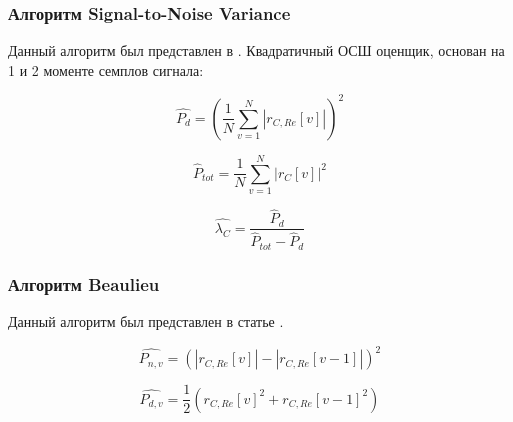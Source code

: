 \subsubsection{Алгоритм Signal-to-Noise Variance}
\label{sssec:snv}

Данный алгоритм был представлен в \cite{snr_pauluzzi, snr_li}. Квадратичный ОСШ оценщик, основан на 1
и 2 моменте семплов сигнала:

\begin{center}
\begin{equation}
	\hat{P_{d}} = (\frac{1}{N} \sum \limits_{v=1}^N \left| r_{C,Re}[v] \right|)^2
\end{equation}
\end{center}

\begin{center}
\begin{equation}
	\hat P_{tot} = \frac{1}{N} \sum \limits_{v=1}^{N} \left|r_C[v] \right| ^2
\end{equation}
\end{center}

\begin{center}
\begin{equation}
	\hat{\lambda_C} = \frac{\hat P_d}{\hat P_{tot} - \hat P_d}
\end{equation}
\end{center}

\subsubsection{Алгоритм Beaulieu}
\label{sssec:beaulieu}

Данный алгоритм был представлен в статье \cite{snr_beaulieu}.

\begin{center}
\begin{equation}
	\hat{P_{n,v}} = (\left| r_{C,Re}[v] \right| - \left| r_{C,Re}[v-1] \right|)^2
\end{equation}
\end{center}

\begin{center}
\begin{equation}
	\hat{P_{d,v}} = \frac{1}{2}(r_{C,Re}[v]^2 + r_{C,Re}[v-1]^2)
\end{equation}
\end{center}

